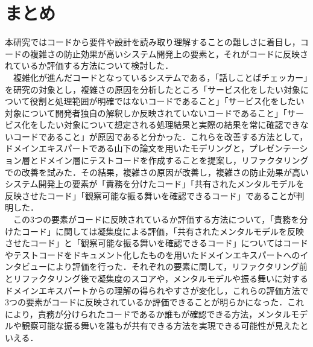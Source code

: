 \documentclass[12pt, a4paper]{jreport}
\begin{document}
\section{まとめ}
本研究ではコードから要件や設計を読み取り理解することの難しさに着目し，コードの複雑さの防止効果が高いシステム開発上の要素と，それがコードに反映されているか評価する方法について検討した．
\\　複雑化が進んだコードとなっているシステムである，「話しことばチェッカー」を研究の対象とし，複雑さの原因を分析したところ「サービス化をしたい対象について役割と処理範囲が明確ではないコードであること」「サービス化をしたい対象について開発者独自の解釈しか反映されていないコードであること」「サービス化をしたい対象について想定される処理結果と実際の結果を常に確認できないコードであること」が原因であると分かった．これらを改善する方法として，ドメインエキスパートである山下の論文を用いたモデリングと，プレゼンテーション層とドメイン層にテストコードを作成することを提案し，リファクタリングでの改善を試みた．その結果，複雑さの原因が改善し，複雑さの防止効果が高いシステム開発上の要素が「責務を分けたコード」「共有されたメンタルモデルを反映させたコード」「観察可能な振る舞いを確認できるコード」であることが判明した．
\\　この3つの要素がコードに反映されているか評価する方法について，「責務を分けたコード」に関しては凝集度による評価，「共有されたメンタルモデルを反映させたコード」と「観察可能な振る舞いを確認できるコード」についてはコードやテストコードをドキュメント化したものを用いたドメインエキスパートへのインタビューにより評価を行った．それぞれの要素に関して，リファクタリング前とリファクタリング後で凝集度のスコアや，メンタルモデルや振る舞いに対するドメインエキスパートからの理解の得られやすさが変化し，これらの評価方法で3つの要素がコードに反映されているか評価できることが明らかになった．これにより，責務が分けられたコードであるか誰もが確認できる方法，メンタルモデルや観察可能な振る舞いを誰もが共有できる方法を実現できる可能性が見えたといえる．
\end{document}
